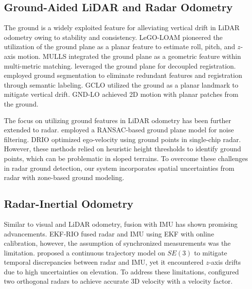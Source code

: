 \subsection{Ground-Aided LiDAR and Radar Odometry}

The ground is a widely exploited feature for alleviating vertical drift in \ac{LiDAR} odometry owing to stability and consistency.
LeGO-LOAM \cite{shan2018lego} pioneered the utilization of the ground plane as a planar feature to estimate roll, pitch, and $z$-axis motion. MULLS \cite{pan2021mulls} integrated the ground plane as a geometric feature within multi-metric matching. \citet{zheng2021efficient} leveraged the ground plane for decoupled registration.
\citet{chen2021low} employed ground segmentation to eliminate redundant features and registration through semantic labeling.
GCLO \cite{wei2022gclo} utilized the ground as a planar landmark to mitigate vertical drift. GND-LO \cite{galeote2023gnd} achieved 2D motion with planar patches from the ground.

The focus on utilizing ground features in LiDAR odometry has been further extended to radar. \citet{li20234d} employed a RANSAC-based ground plane model for noise filtering. DRIO \cite{chen2023drio} optimized ego-velocity using ground points in single-chip radar. However, these methods relied on heuristic height thresholds to identify ground points, which can be problematic in sloped terrains.
To overcome these challenges in radar ground detection, our system incorporates spatial uncertainties from radar with zone-based ground modeling.

\subsection{Radar-Inertial Odometry}

Similar to visual and \ac{LiDAR} odometry, fusion with \ac{IMU} has shown promising advancements. EKF-RIO \cite{DoerENC2020} fused radar and \ac{IMU} using \ac{EKF} with online calibration, however, the assumption of synchronized measurements was the limitation. \citet{ng2021continuous} proposed a continuous trajectory model on $SE(3)$ to mitigate temporal discrepancies between radar and \ac{IMU}, yet it encountered $z$-axis drifts due to high uncertainties on elevation. To address these limitations, \citet{park20213d} configured two orthogonal radars to achieve accurate 3D velocity with a velocity factor.

